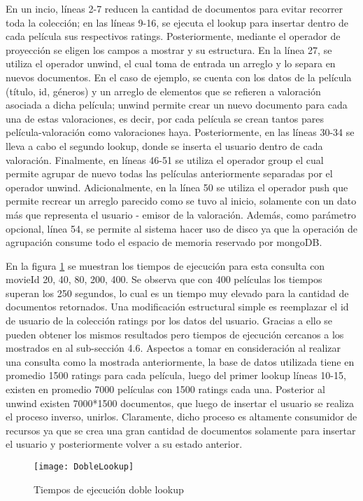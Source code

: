 \documentclass[conference,compsoc]{sty/IEEEtran}
\begin{document}
En un incio, líneas 2-7 reducen la cantidad de documentos para evitar recorrer toda la colección; en las líneas 9-16, se ejecuta el lookup para insertar dentro de cada película sus respectivos ratings. Posteriormente, mediante el operador de proyección se eligen los campos a mostrar y su estructura. En la línea 27, se utiliza el operador unwind, el cual toma de entrada un arreglo y lo separa en nuevos documentos. En el caso de ejemplo, se cuenta con los datos de la película (título, id, géneros) y un arreglo de elementos que se refieren a valoración asociada a dicha película; unwind permite crear un nuevo documento para cada una de estas valoraciones, es decir, por cada película se crean tantos pares película-valoración como valoraciones haya. Posteriormente, en las líneas 30-34 se lleva a cabo el segundo lookup, donde se inserta el usuario dentro de cada valoración. Finalmente, en líneas 46-51 se utiliza el operador group el cual permite agrupar de nuevo todas las películas anteriormente separadas por el operador unwind. Adicionalmente, en la línea 50 se utiliza el operador push que permite recrear  un arreglo parecido como se tuvo al inicio, solamente con un dato más que representa el usuario - emisor de la valoración. Además, como parámetro opcional, línea 54, se permite al sistema hacer uso de disco ya que la operación de agrupación consume todo el espacio de memoria reservado por mongoDB.  \par 

En la figura \ref{fig:doubleJoinTiempos} se muestran los tiempos de ejecución para esta consulta con movieId 20, 40, 80, 200, 400. Se observa que con 400 películas los tiempos superan los 250 segundos, lo cual es un tiempo muy elevado para la cantidad de documentos retornados. Una modificación estructural simple es reemplazar el id de usuario de la colección ratings por los datos del usuario. Gracias a ello se pueden obtener los mismos resultados pero tiempos de ejecución cercanos a los mostrados en al sub-sección 4.6.
Aspectos a tomar en consideración al realizar una consulta como la mostrada anteriormente, la base de datos utilizada tiene en promedio 1500 ratings para cada película, luego del primer lookup líneas 10-15, existen en promedio 7000 películas con 1500 ratings cada una. Posterior al unwind existen 7000*1500 documentos, que luego de insertar el usuario se realiza el proceso inverso, unirlos. Claramente, dicho proceso es altamente consumidor de recursos ya que se crea una gran cantidad de documentos solamente para insertar el usuario y posteriormente volver a su estado anterior. 
\begin{figure}
\begin{center}
\texttt{[image: DobleLookup]}
\end{center}
\caption{Tiempos de ejecución doble lookup} 
\label{fig:doubleJoinTiempos}
\end{figure}
\end{document}
